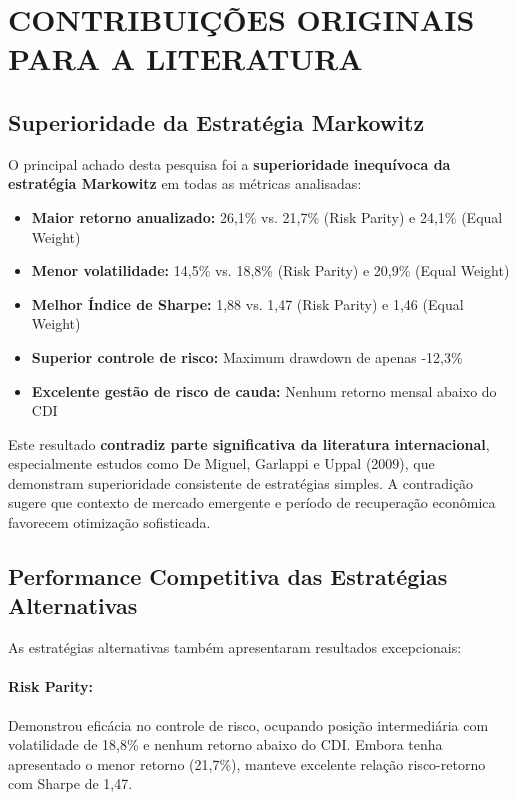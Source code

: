 \section{CONTRIBUIÇÕES ORIGINAIS PARA A LITERATURA}

\subsection{Superioridade da Estratégia Markowitz}

O principal achado desta pesquisa foi a \textbf{superioridade inequívoca da estratégia Markowitz} em todas as métricas analisadas:

\begin{itemize}
    \item \textbf{Maior retorno anualizado:} 26,1\% vs. 21,7\% (Risk Parity) e 24,1\% (Equal Weight)
    \item \textbf{Menor volatilidade:} 14,5\% vs. 18,8\% (Risk Parity) e 20,9\% (Equal Weight)
    \item \textbf{Melhor Índice de Sharpe:} 1,88 vs. 1,47 (Risk Parity) e 1,46 (Equal Weight)
    \item \textbf{Superior controle de risco:} Maximum drawdown de apenas -12,3\%
    \item \textbf{Excelente gestão de risco de cauda:} Nenhum retorno mensal abaixo do CDI
\end{itemize}

Este resultado \textbf{contradiz parte significativa da literatura internacional}, especialmente estudos como De Miguel, Garlappi e Uppal (2009), que demonstram superioridade consistente de estratégias simples. A contradição sugere que contexto de mercado emergente e período de recuperação econômica favorecem otimização sofisticada.

\subsection{Performance Competitiva das Estratégias Alternativas}

As estratégias alternativas também apresentaram resultados excepcionais:

\paragraph{Risk Parity:} Demonstrou eficácia no controle de risco, ocupando posição intermediária com volatilidade de 18,8\% e nenhum retorno abaixo do CDI. Embora tenha apresentado o menor retorno (21,7\%), manteve excelente relação risco-retorno com Sharpe de 1,47.

